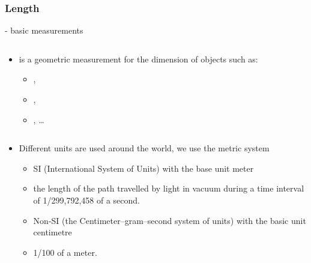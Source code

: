 \begin{module}[id=lenght]
\begin{frame}
  \frametitle{Length}
  - basic measurements\\
  \begin{columns}
    \begin{column}{5.8cm}
      \begin{itemize}
      \item
      \begin{definition}
         is a geometric measurement for the dimension of objects such as:
        \begin{itemize}
        \item {},
        \item {},
        \item {}, \ldots
        \end{itemize}
      \end{definition}
    \end{itemize}
    \end{column}
    \begin{column}{5.5cm}
    \end{column}
  \end{columns}
\begin{itemize}
\item Different units are used around the world, we use the metric system
  	\begin{itemize}
  	\item SI (International System of Units) with the base unit meter
  	\item 	\begin{definition}
		  		 the length of the path travelled by light in vacuum during a time interval of 1/299,792,458 of a second.
			\end{definition}
  	\item Non-SI (the Centimeter–gram–second system of units) with the basic unit centimetre
  	\item 	\begin{definition}
			   1/100 of a meter.
			\end{definition}
	\end{itemize}
\end{itemize}
\end{frame}
\end{module}
